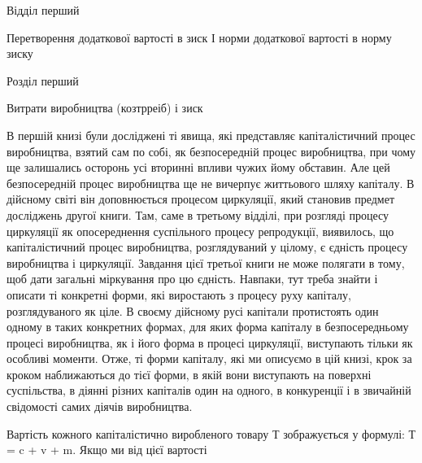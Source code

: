 Відділ перший

Перетворення додаткової вартості в зиск
І норми додаткової вартості в норму зиску

Розділ перший

Витрати виробництва (козтрреіб) і зиск

В першій книзі були досліджені ті явища, які представляє капіталістичний
процес виробництва, взятий сам по собі, як безпосередній
процес виробництва, при чому ще залишались осторонь
усі вторинні впливи чужих йому обставин. Але цей безпосередній
процес виробництва ще не вичерпує життьового шляху капіталу.
В дійсному світі він доповнюється процесом циркуляції,
який становив предмет досліджень другої книги. Там, саме в
третьому відділі, при розгляді процесу циркуляції як опосереднення
суспільного процесу репродукції, виявилось, що капіталістичний
процес виробництва, розглядуваний у цілому, є єдність
процесу виробництва і циркуляції. Завдання цієї третьої книги
не може полягати в тому, щоб дати загальні міркування про цю
єдність. Навпаки, тут треба знайти і описати ті конкретні форми,
які виростають з процесу руху капіталу, розглядуваного як
ціле. В своєму дійсному русі капітали протистоять один одному
в таких конкретних формах, для яких форма капіталу в безпосередньому
процесі виробництва, як і його форма в процесі циркуляції,
виступають тільки як особливі моменти. Отже, ті форми
капіталу, які ми описуємо в цій книзі, крок за кроком наближаються
до тієї форми, в якій вони виступають на поверхні
суспільства, в діянні різних капіталів один на одного, в конкуренції
і в звичайній свідомості самих діячів виробництва.

Вартість кожного капіталістично виробленого товару Т зображується
у формулі: Т = c + v + m. Якщо ми від цієї вартості
\parbreak{}  %

